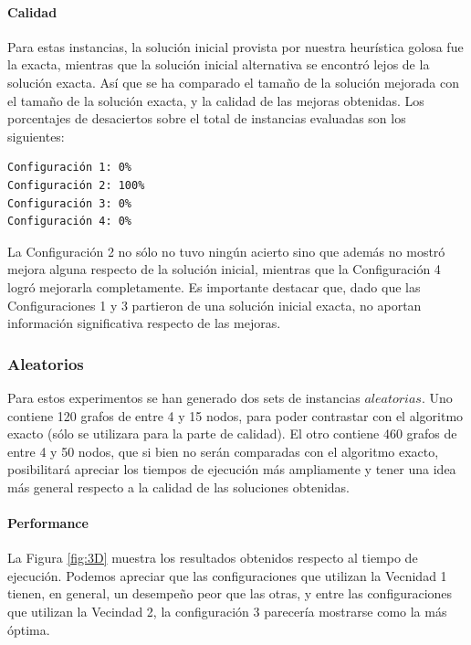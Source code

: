 \paragraph{Calidad} Para estas instancias, la solución inicial provista por nuestra heurística golosa fue la exacta, mientras que la solución inicial alternativa se encontró lejos de la solución exacta. Así que se ha comparado el tamaño de la solución mejorada con el tamaño de la solución exacta, y la calidad de las mejoras obtenidas.  Los porcentajes de desaciertos sobre el total de instancias evaluadas son los siguientes:

\begin{verbatim}
Configuración 1: 0%
Configuración 2: 100%
Configuración 3: 0%
Configuración 4: 0%
\end{verbatim}

La Configuración 2 no sólo no tuvo ningún acierto sino que además no mostró mejora alguna respecto de la solución inicial, mientras que la Configuración 4 logró mejorarla completamente.  Es importante destacar que, dado que las Configuraciones 1 y 3 partieron de una solución inicial exacta, no aportan información significativa respecto de las mejoras.

\subsubsection{Aleatorios}

Para estos experimentos se han generado dos sets de instancias $aleatorias$. Uno contiene 120 grafos de entre 4 y 15 nodos, para poder contrastar con el algoritmo exacto (sólo se utilizara para la parte de calidad). El otro contiene 460 grafos de entre 4 y 50 nodos, que si bien no serán comparadas con el algoritmo exacto, posibilitará apreciar los tiempos de ejecución más ampliamente y tener una idea más general respecto a la calidad de las soluciones obtenidas.

\paragraph{Performance} La Figura \ref{fig:3D} muestra los resultados obtenidos respecto al tiempo de ejecución. Podemos apreciar que las configuraciones que utilizan la Vecnidad 1 tienen, en general, un desempeño peor que las otras, y entre las configuraciones que utilizan la Vecindad 2, la configuración 3 parecería mostrarse como la más óptima.

